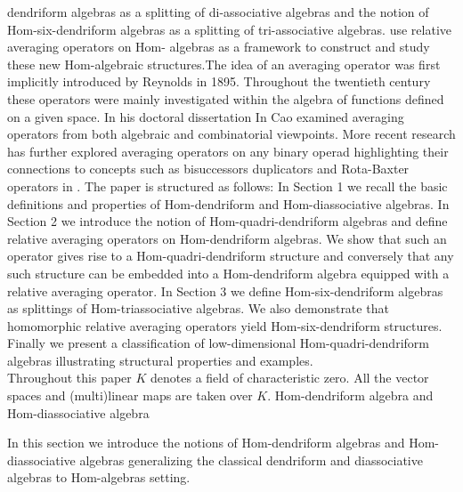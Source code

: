 \documentclass[11pt,twoside,reqno]{amsart}
\makeatletter
\renewcommand{\section}{\@startsection{section}{1}
  \z@{.7\linespacing\@plus\linespacing}{.5\linespacing}
  {\normalfont\upshape\bfseries\centering}}
\theoremstyle{plain}
\theoremstyle{definition}
\makeatother
\begin{document}
dendriform algebras as a splitting of di-associative algebras and 
 the notion of Hom-six-dendriform algebras as a splitting of tri-associative algebras. use relative averaging operators on Hom- algebras  as a framework to construct and study these new Hom-algebraic structures.The idea of an averaging operator was first implicitly introduced by Reynolds in 1895. Throughout the twentieth century  these operators were mainly investigated within the algebra of functions defined on a given space. In his doctoral dissertation  In \cite{AO} Cao examined averaging operators from both algebraic and combinatorial viewpoints. More recent research has further explored averaging operators on any binary operad  highlighting their connections to concepts such as bisuccessors  duplicators  and Rota-Baxter operators in 
\cite{AG, AO1, AO2,Basdouri4, Basdouri3,MK}.  
The paper is structured as follows: In Section 1  we recall the basic definitions and properties of Hom-dendriform and Hom-diassociative algebras. In Section 2  we introduce the notion of Hom-quadri-dendriform algebras and define relative averaging operators on Hom-dendriform algebras. We show that such an operator gives rise to a Hom-quadri-dendriform structure  and conversely  that any such structure can be embedded into a Hom-dendriform algebra equipped with a relative averaging operator. In Section 3  we define Hom-six-dendriform algebras as splittings of Hom-triassociative algebras. We also demonstrate that homomorphic relative averaging operators yield Hom-six-dendriform structures. Finally  we present a classification of low-dimensional Hom-quadri-dendriform algebras  illustrating structural properties and examples.\\
 Throughout this paper  $K$ denotes a field of characteristic zero. All the vector spaces
 and (multi)linear maps are taken over $K$.
\section{Hom-dendriform algebra and Hom-diassociative algebra}

In this section  we introduce the notions of Hom-dendriform algebras and Hom-diassociative algebras
 generalizing the classical dendriform and diassociative algebras to Hom-algebras setting.
\end{document}
